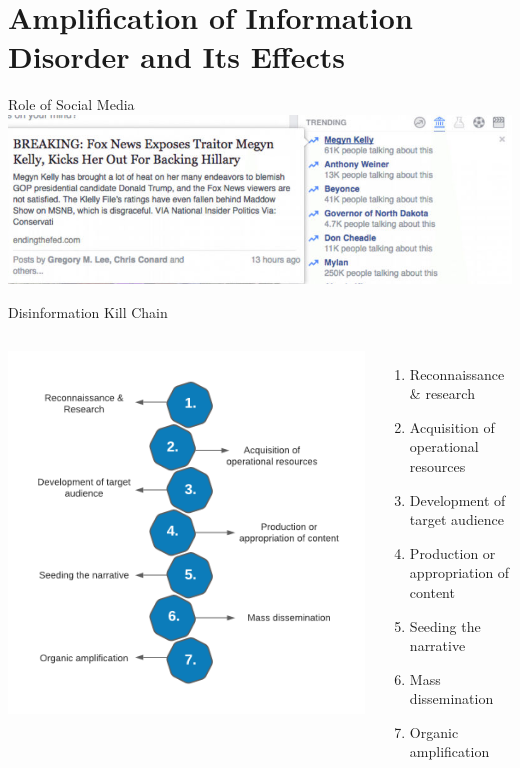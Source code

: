 \documentclass[nobackground,dvipsnames,table,aspectratio=169]{beamer}
\begin{document}
\section{Amplification of Information Disorder and Its Effects}

\begin{frame}{Role of Social Media}
    \includegraphics[width=\textwidth]{role-of-social-media}
\end{frame}

\begin{frame}{Disinformation Kill Chain}
    \begin{columns}
            \includegraphics[width=\textwidth]{disinfo-kill-chain}
            \begin{enumerate}
                \item Reconnaissance \& research
                \item Acquisition of operational resources
                \item Development of target audience
                \item Production or appropriation of content
                \item Seeding the narrative
                \item Mass dissemination 
                \item Organic amplification
            \end{enumerate}
    \end{columns}
\end{frame}
\end{document}

